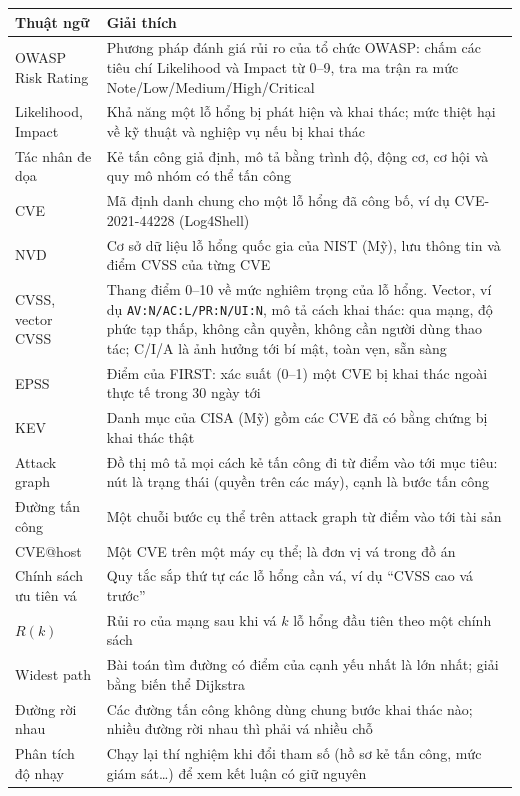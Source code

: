 \documentclass[11pt,a4paper]{article}
\begin{document}
\begin{center}
\small
\begin{tabular}{@{}Y{3.3cm}Y{11.7cm}@{}}
\toprule
\textbf{Thuật ngữ} & \textbf{Giải thích} \\
\midrule
OWASP Risk Rating & Phương pháp đánh giá rủi ro của tổ chức OWASP: chấm các tiêu chí Likelihood và Impact từ 0--9, tra ma trận ra mức Note/Low/Medium/High/Critical \\
Likelihood, Impact & Khả năng một lỗ hổng bị phát hiện và khai thác; mức thiệt hại về kỹ thuật và nghiệp vụ nếu bị khai thác \\
Tác nhân đe dọa & Kẻ tấn công giả định, mô tả bằng trình độ, động cơ, cơ hội và quy mô nhóm có thể tấn công \\
CVE & Mã định danh chung cho một lỗ hổng đã công bố, ví dụ CVE-2021-44228 (Log4Shell) \\
NVD & Cơ sở dữ liệu lỗ hổng quốc gia của NIST (Mỹ), lưu thông tin và điểm CVSS của từng CVE \\
CVSS, vector CVSS & Thang điểm 0--10 về mức nghiêm trọng của lỗ hổng. Vector, ví dụ \texttt{AV:N/AC:L/PR:N/UI:N}, mô tả cách khai thác: qua mạng, độ phức tạp thấp, không cần quyền, không cần người dùng thao tác; C/I/A là ảnh hưởng tới bí mật, toàn vẹn, sẵn sàng \\
EPSS & Điểm của FIRST: xác suất (0--1) một CVE bị khai thác ngoài thực tế trong 30 ngày tới \\
KEV & Danh mục của CISA (Mỹ) gồm các CVE đã có bằng chứng bị khai thác thật \\
Attack graph & Đồ thị mô tả mọi cách kẻ tấn công đi từ điểm vào tới mục tiêu: nút là trạng thái (quyền trên các máy), cạnh là bước tấn công \\
Đường tấn công & Một chuỗi bước cụ thể trên attack graph từ điểm vào tới tài sản \\
CVE@host & Một CVE trên một máy cụ thể; là đơn vị vá trong đồ án \\
Chính sách ưu tiên vá & Quy tắc sắp thứ tự các lỗ hổng cần vá, ví dụ ``CVSS cao vá trước'' \\
$R(k)$ & Rủi ro của mạng sau khi vá $k$ lỗ hổng đầu tiên theo một chính sách \\
Widest path & Bài toán tìm đường có điểm của cạnh yếu nhất là lớn nhất; giải bằng biến thể Dijkstra \\
Đường rời nhau & Các đường tấn công không dùng chung bước khai thác nào; nhiều đường rời nhau thì phải vá nhiều chỗ \\
Phân tích độ nhạy & Chạy lại thí nghiệm khi đổi tham số (hồ sơ kẻ tấn công, mức giám sát\ldots) để xem kết luận có giữ nguyên \\

\end{tabular}
\end{center}
\end{document}
